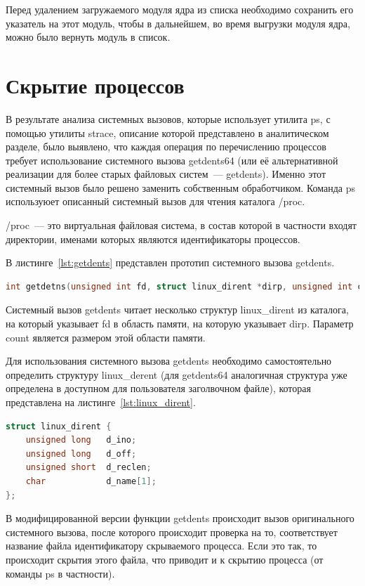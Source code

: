Перед удалением загружаемого модуля ядра из списка необходимо сохранить его указатель на этот модуль, чтобы в дальнейшем, во время выгрузки модуля ядра, можно было вернуть модуль в список.

\section{Скрытие процессов}%
\label{sec:skrytie_protsessov}

В результате анализа системных вызовов, которые использует утилита ps, с помощью утилиты strace, описание которой представлено в аналитическом разделе, было выявлено, что каждая операция по перечислению процессов требует использование системного вызова getdents64 (или её альтернативной реализации для более старых файловых систем~--- getdents). Именно этот системный вызов было решено заменить собственным обработчиком. Команда ps используюет описанный системный вызов для чтения каталога /proc.

/proc~--- это виртуальная файловая система, в состав которой в частности входят директории, именами которых являются идентификаторы процессов.

В листинге~\ref{lst:getdents} представлен прототип системного вызова getdents.
\begin{lstlisting}[language=c,caption={Прототип системного вызова getdents},label=lst:getdents]
int getdetns(unsigned int fd, struct linux_dirent *dirp, unsigned int count);    
\end{lstlisting}

Системный вызов getdents читает несколько структур linux\_dirent из каталога, на который указывает fd в область памяти, на которую указывает dirp. Параметр count является размером этой области памяти.

Для использования системного вызова getdents необходимо самостоятельно определить структуру linux\_derent (для getdents64 аналогичная структура уже определена в доступном для пользователя заголвочном файле), которая представлена на листинге~\ref{lst:linux_dirent}.
\begin{lstlisting}[language=c,caption={Структура linux\_dirent},label=lst:linux_dirent]
struct linux_dirent {
    unsigned long	d_ino;
    unsigned long	d_off;
    unsigned short	d_reclen;
    char		    d_name[1];
};
\end{lstlisting}

В модифицированной версии функции getdents происходит вызов оригинального системного вызова, после которого происходит проверка на то, соответствует название файла идентификатору скрываемого процесса. Если это так, то происходит скрытия этого файла, что приводит и к скрытию процесса (от команды ps в частности).

